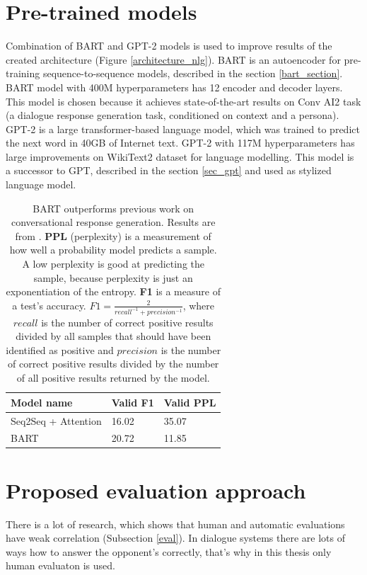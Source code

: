 \section{Pre-trained models}
Combination of BART and GPT-2 models is used to improve results of the created architecture (Figure \ref{architecture_nlg}). BART is an autoencoder for pre-training sequence-to-sequence models, described in the section \ref{bart_section}. BART model with 400M hyperparameters has 12 encoder and decoder layers. This model is chosen because it achieves state-of-the-art results on Conv AI2 task (a dialogue response generation task, conditioned on context and a persona). GPT-2 is a large transformer-based language model, which was trained to predict the next word in 40GB of Internet text. GPT-2 with 117M hyperparameters has large improvements on WikiText2 dataset for language modelling. This model is a successor to GPT, described in the section \ref{sec_gpt} and used as stylized language model. 

\begin{table}[ht]
\centering
 \begin{tabular}{|p{5cm}|p{3cm}|p{3cm}|} 
 \hline
 \textbf{Model name} & \textbf{Valid F1} & \textbf{Valid PPL} \\
 \hline
 Seq2Seq + Attention & 16.02 & 35.07 \\
 \hline
 BART & 20.72 & 11.85 \\
 \hline
 \end{tabular}
 \caption{BART outperforms previous work on conversational response generation. Results are from \cite{lewis2019bart}. \textbf{PPL} (perplexity) is a measurement of how well a probability model predicts a sample. A low perplexity is good at predicting the sample, because perplexity is just an exponentiation of the entropy. \textbf{F1} is a measure of a test's accuracy. $F1 = \frac{2}{recall^{-1} + precision^{-1}}$, where $recall$ is the number of correct positive results divided by all samples that should have been identified as positive and $precision$ is the number of correct positive results divided by the number of all positive results returned by the model.}
\label{tab:bart_statistic}
\end{table}

\section{Proposed evaluation approach}
There is a lot of research, which shows that human and automatic evaluations have weak correlation (Subsection \ref{eval}). In dialogue systems there are lots of ways how to answer the opponent's correctly, that's why in this thesis only human evaluaton is used. 

